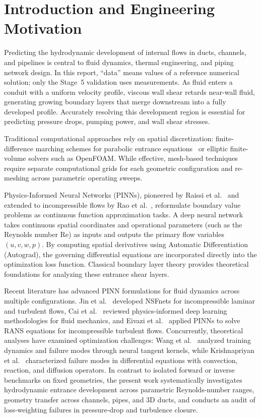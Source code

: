 \documentclass[11pt,a4paper]{article}
\begin{document}
\section{Introduction and Engineering Motivation}
\label{sec:intro}
Predicting the hydrodynamic development of internal flows in ducts, channels, and pipelines is central to fluid dynamics, thermal engineering, and piping network design. In this report, ``data'' means values of a reference numerical solution; only the Stage~5 validation uses measurements. As fluid enters a conduit with a uniform velocity profile, viscous wall shear retards near-wall fluid, generating growing boundary layers that merge downstream into a fully developed profile. Accurately resolving this development region is essential for predicting pressure drops, pumping power, and wall shear stresses.

Traditional computational approaches rely on spatial discretization: finite-difference marching schemes for parabolic entrance equations~\cite[Chs.~6--7, pp.~153--202]{hornbeck1973} or elliptic finite-volume solvers such as OpenFOAM. While effective, mesh-based techniques require separate computational grids for each geometric configuration and re-meshing across parametric operating sweeps. 

Physics-Informed Neural Networks (PINNs), pioneered by Raissi et al.~\cite[abstract, p.~1]{raissi2019} and extended to incompressible flows by Rao et al.~\cite[Sec.~2, p.~2]{rao2020}, reformulate boundary value problems as continuous function approximation tasks. A deep neural network takes continuous spatial coordinates and operational parameters (such as the Reynolds number $\mathrm{Re}$) as inputs and outputs the primary flow variables $(u, v, w, p)$. By computing spatial derivatives using Automatic Differentiation (Autograd), the governing differential equations are incorporated directly into the optimization loss function. Classical boundary layer theory provides theoretical foundations for analyzing these entrance shear layers.

Recent literature has advanced PINN formulations for fluid dynamics across multiple configurations. Jin et al.~\cite[abstract, p.~1]{jin2021} developed NSFnets for incompressible laminar and turbulent flows, Cai et al.~\cite[abstract, p.~1]{cai2021} reviewed physics-informed deep learning methodologies for fluid mechanics, and Eivazi et al.~\cite[abstract, p.~1]{eivazi2022} applied PINNs to solve RANS equations for incompressible turbulent flows. Concurrently, theoretical analyses have examined optimization challenges: Wang et al.~\cite[abstract, p.~1]{wang2022ntk} analyzed training dynamics and failure modes through neural tangent kernels, while Krishnapriyan et al.~\cite[abstract, p.~1]{krishnapriyan2021} characterized failure modes in differential equations with convection, reaction, and diffusion operators. In contrast to isolated forward or inverse benchmarks on fixed geometries, the present work systematically investigates hydrodynamic entrance development across parametric Reynolds-number ranges, geometry transfer across channels, pipes, and 3D ducts, and conducts an audit of loss-weighting failures in pressure-drop and turbulence closure.
\end{document}
